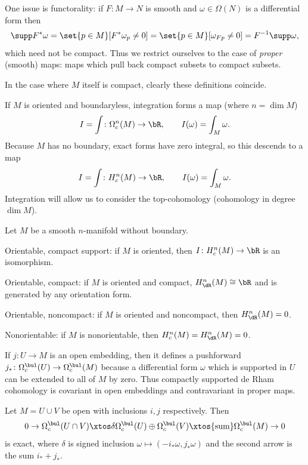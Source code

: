 One issue is functorality: if $F\colon M\to N$ is smooth and $\omega\in\Omega(N)$ is a differential form then
$$ \supp F^*\omega = \set{p\in M}[F^*\omega_p\neq0] = \set{p\in M}[\omega_{Fp}\neq0] = F^{-1}\supp\omega , $$
which need not be compact.
Thus we restrict ourselves to the case of {\it proper\/} (smooth) maps: maps which pull back compact subsets to compact subsets.

In the case where $M$ itself is compact, clearly these definitions coincide.

If $M$ is oriented and boundaryless, integration forms a map (where $n=\dim M$)
$$ I = \int \colon \Omega^n_c(M) \to \bR,\qquad I(\omega) = \int_M\omega . $$
Because $M$ has no boundary, exact forms have zero integral, so this descends to a map
$$ I = \int \colon H^n_c(M) \to \bR,\qquad I(\omega) = \int_M\omega . $$
Integration will allow us to consider the top-cohomology (cohomology in degree $\dim M$).

\bthrm[title={Top Cohomology}, name={topcohomologycases}]

    Let $M$ be a smooth $n$-manifold without boundary.
    \benum
        \item {\emphcolor Orientable, compact support}: if $M$ is oriented, then $I\colon H^n_c(M)\to\bR$ is an isomorphism.
        \item {\emphcolor Orientable, compact}: if $M$ is oriented and compact, $H^n_\dR(M)\cong\bR$ and is generated by any
        orientation form.
        \item {\emphcolor Orientable, noncompact}: if $M$ is oriented and noncompact, then $H^n_\dR(M)=0$.
        \item {\emphcolor Nonorientable}: if $M$ is nonorientable, then $H^n_c(M)=H^n_\dR(M)=0$.
    \eenum

\ethrm

If $j\colon U\to M$ is an open embedding, then it defines a pushforward $j_*\colon\Omega^\bul_c(U)\to\Omega^\bul_c(M)$ because
a differential form $\omega$ which is supported in $U$ can be extended to all of $M$ by zero.
Thus compactly supported de Rham cohomology is covariant in open embeddings and contravariant in proper maps.

\bthrm[title={Compact Support Mayer-Vietoris}, name={mayervietcs}]

    Let $M=U\cup V$ be open with inclusions $i,j$ respectively.
    Then
    $$ 0 \to \Omega^\bul_c(U\cap V) \xtos\delta \Omega^\bul_c(U)\oplus\Omega^\bul_c(V) \xtos{\text{sum}} \Omega^\bul_c(M)
    \to 0 $$
    is exact, where $\delta$ is signed inclusion $\omega\mapsto(-i_*\omega,j_*\omega)$ and the second arrow is the sum
    $i_*+j_*$.

